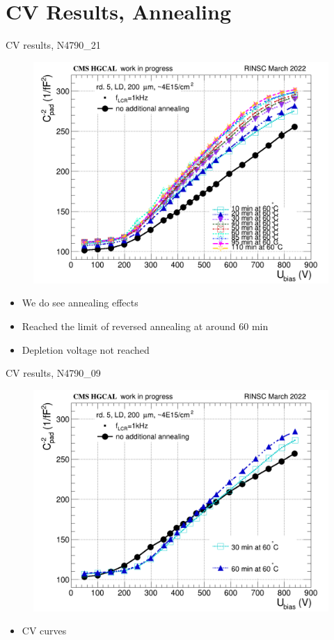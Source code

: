 \documentclass{beamer}
\begin{document}
\section{CV Results, Annealing}

\begin{frame}{CV results, N4790\_21}
  \begin{figure}
      \includegraphics[width=.6\textwidth]{plots/annealing_CV_ch101_N4790_21.png}    
  \end{figure}
  \begin{itemize}
    \item We do see annealing effects
    \item Reached the limit of reversed annealing at around \alert{60 min}
    \item  Depletion voltage not reached 
  \end{itemize}
\end{frame}

\begin{frame}{CV results, N4790\_09}
  \begin{figure}
      \includegraphics[width=.7\textwidth]{plots/annealing_CV_ch101_N4790_09.png}    
  \end{figure}
  \begin{itemize}
    \item CV curves
  \end{itemize}
\end{frame}
\end{document}
